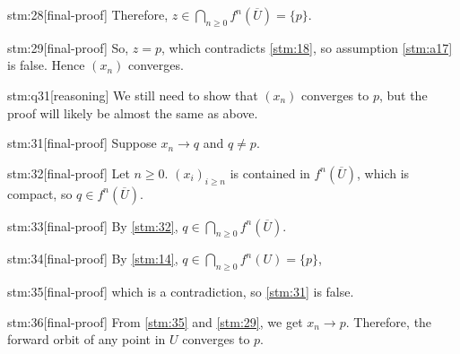 \documentclass{article}
\begin{document}
\begin{stm}{stm:28}[final-proof]
Therefore, $z \in \bigcap_{n \ge 0} f^n(\overline{U}) = \{p\}$.
\end{stm}

\begin{stm}{stm:29}[final-proof]
So, $z = p$, which contradicts \ref{stm:18}, so assumption \ref{stm:a17} is false. Hence $(x_n)$ converges.
\end{stm}

\begin{stm}{stm:q31}[reasoning]
We still need to show that $(x_n)$ converges to $p$, but the proof will likely be almost the same as above.
\end{stm}

\begin{stm}{stm:31}[final-proof]
Suppose $x_n \to q$ and $q \ne p$.
\end{stm}

\begin{stm}{stm:32}[final-proof]
Let $n \ge 0$. $(x_i)_{i \ge n}$ is contained in $f^n(\overline{U})$, which is compact, so $q \in f^n(\overline{U})$.
\end{stm}

\begin{stm}{stm:33}[final-proof]
By \ref{stm:32}, $q \in \bigcap_{n \ge 0} f^n(\overline{U})$.
\end{stm}

\begin{stm}{stm:34}[final-proof]
By \ref{stm:14}, $q \in \bigcap_{n \ge 0} f^n(U) = \{p\}$,
\end{stm}

\begin{stm}{stm:35}[final-proof]
which is a contradiction, so \ref{stm:31} is false.
\end{stm}

\begin{stm}{stm:36}[final-proof]
From \ref{stm:35} and \ref{stm:29}, we get $x_n \to p$. Therefore, the forward orbit of any point in $U$ converges to $p$.
\end{stm}
\end{document}
